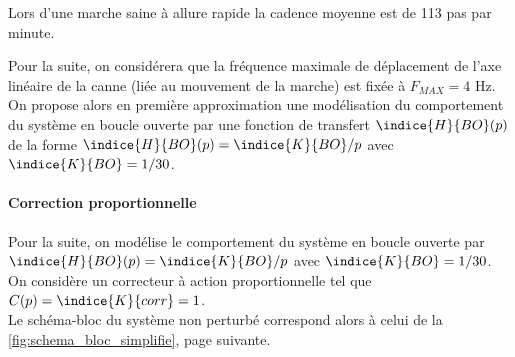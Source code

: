 \ifprof
\else
\vspace*{1em}
Lors d'une marche saine à allure rapide la cadence moyenne est de 113 pas par minute.
\fi


\ifprof
{}
\fi

\ifprof
\else
\vspace*{1em}
Pour la suite, on considérera que la fréquence maximale de déplacement de l'axe linéaire de  la canne (liée au mouvement de la marche) est fixée à $F_{MAX} = 4$ Hz. On propose alors en première approximation une modélisation du comportement du système en boucle ouverte par une fonction de transfert $\indice{H}{BO}(p)$ de la forme $\indice{H}{BO}(p) = \indice{K}{BO}/p$ avec $\indice{K}{BO} = 1/30$.
\fi


\ifprof
{}
\fi

\ifprof
\else
\paragraph{Correction proportionnelle}

Pour la suite, on modélise le comportement du système en boucle ouverte par $\indice{H}{BO}(p) = \indice{K}{BO}/p$ avec $\indice{K}{BO} = 1/30$. On considère un correcteur à action proportionnelle tel que $C(p) = \indice{K}{corr} = 1$. \\
Le schéma-bloc du système non perturbé correspond alors à celui de la \ref{fig:schema_bloc_simplifie}, page suivante.


